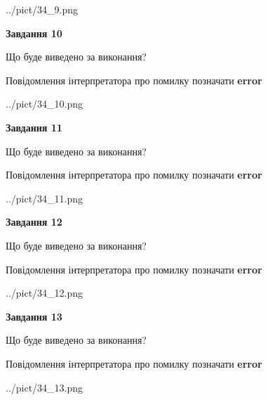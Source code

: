 \documentclass[11pt, ukrainian]{article}
\begin{document}
{\begin {large}
\begin{center}
	{../pict/34_9.png}
\end{center}
\newpage

{\begin {center}\textbf{Завдання 10}\end {center}}\par
Що буде виведено за виконання? \par
Повідомлення інтерпретатора про помилку позначати \textbf{error}

\begin{center}
	{../pict/34_10.png}
\end{center}
\newpage

{\begin {center}\textbf{Завдання 11}\end {center}}\par
Що буде виведено за виконання? \par
Повідомлення інтерпретатора про помилку позначати \textbf{error}

\begin{center}
	{../pict/34_11.png}
\end{center}
\newpage

{\begin {center}\textbf{Завдання 12}\end {center}}\par
Що буде виведено за виконання? \par
Повідомлення інтерпретатора про помилку позначати \textbf{error}

\begin{center}
	{../pict/34_12.png}
\end{center}
\newpage

{\begin {center}\textbf{Завдання 13}\end {center}}\par
Що буде виведено за виконання? \par
Повідомлення інтерпретатора про помилку позначати \textbf{error}

\begin{center}
	{../pict/34_13.png}
\end{center}
\newpage


\end{large}}
\end{document}
